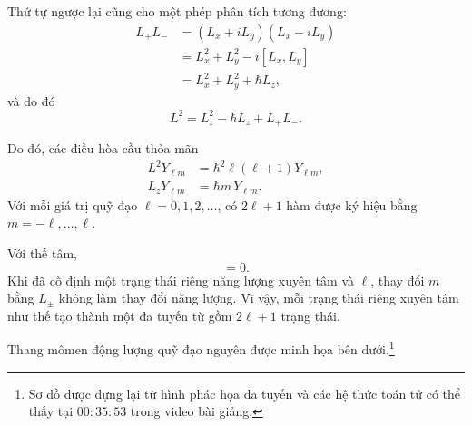 Thứ tự ngược lại cũng cho một phép phân tích tương đương:
\begin{align}
L_+L_-
&=(L_x+iL_y)(L_x-iL_y) \\
&=L_x^2+L_y^2-i[L_x,L_y] \\
&=L_x^2+L_y^2+\hbar L_z,
\end{align}
và do đó
\begin{equation}
L^2=L_z^2-\hbar L_z+L_+L_-.
\end{equation}

\begin{classroomqa}\end{classroomqa}

Do đó, các điều hòa cầu thỏa mãn
\begin{align}
L^2Y_{\ell m}
&=\hbar^2\ell(\ell+1)Y_{\ell m}, \\
L_zY_{\ell m}
&=\hbar m\,Y_{\ell m}.
\end{align}
Với mỗi giá trị quỹ đạo \(\ell=0,1,2,\ldots\), có \(2\ell+1\) hàm được ký hiệu bằng \(m=-\ell,\ldots,\ell\).

Với thế tâm,
\begin{equation}
[H,L_i]=0.
\end{equation}
Khi đã cố định một trạng thái riêng năng lượng xuyên tâm và \(\ell\), thay đổi \(m\) bằng \(L_\pm\) không làm thay đổi năng lượng. Vì vậy, mỗi trạng thái riêng xuyên tâm như thế tạo thành một đa tuyến từ gồm \(2\ell+1\) trạng thái.

Thang mômen động lượng quỹ đạo nguyên được minh họa bên dưới.\footnote{Sơ đồ được dựng lại từ hình phác họa đa tuyến và các hệ thức toán tử có thể thấy tại \(00{:}35{:}53\) trong video bài giảng.}

